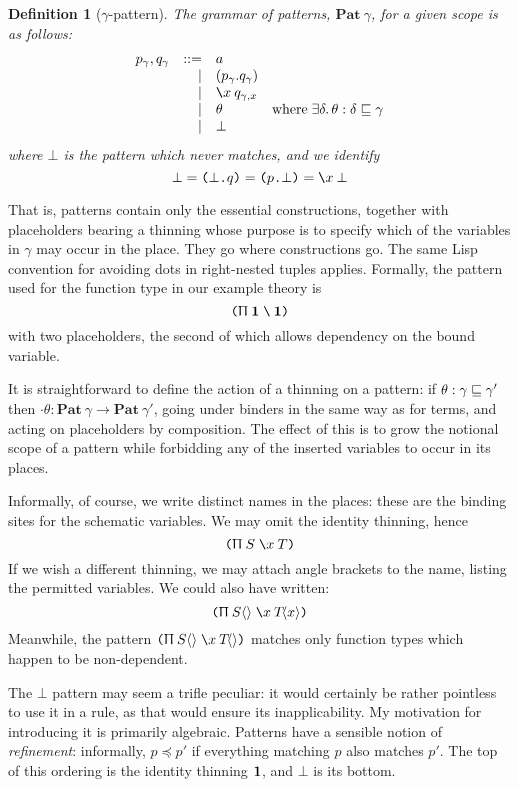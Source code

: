 \documentclass{jfp1}
\newtheorem{definition}[theorem]{Definition}
\newcommand{\Pa}[1]{\texttt{(}#1\texttt{)}}
\newcommand{\dt}{\texttt{.}}
\newcommand{\cn}[2]{\Pa{#1 \dt #2}}
\begin{document}
\newcommand{\Pat}[1]{\textbf{Pat}\:#1}
\begin{definition}[$\gamma$-pattern]
The grammar of patterns, $\Pat\gamma$, for a given scope is as follows:
\[\begin{array}{rrl@{\quad}l}
    p_\gamma, q_\gamma & ::= & a \\
         &   | & (p_\gamma.q_\gamma) \\
         &   | & \la x q_{\gamma,x} \\
         &   | & \theta & \mbox{where}\;\exists\delta.\,\theta :
                          \delta\thin\gamma \\
         &   | & \bot
  \end{array}\]
where $\bot$ is the pattern which \emph{never} matches, and we identify
\[\bot = \cn\bot q = \cn p\bot = \la x\bot
  \]
\end{definition}

\newcommand{\huth}[1]{\langle #1 \rangle}
That is, patterns contain only the essential constructions, together with
placeholders bearing a thinning whose purpose is to specify which of
the variables in $\gamma$ may occur in the place. They go where constructions
go. The same Lisp convention for avoiding dots in right-nested tuples applies.
Formally, the pattern used for the function type in our example theory is
\[
  \PI \ith {}\ith
\]
with two placeholders, the second of which allows dependency on the
bound variable.

It is straightforward to define the action of a thinning on a pattern: if
$\theta : \gamma\sqsubseteq\gamma'$ then $\cdot\theta :
\Pat\gamma\to\Pat{\gamma'}$, going under binders in the same way as
for terms, and acting on placeholders by composition.
The effect of this is to grow the notional scope of a pattern while
forbidding any of the inserted variables to occur in its places.

Informally, of course, we write distinct names in the places: these are the
binding sites for the schematic variables. We may omit the identity thinning,
hence
\[
  \PI SxT
\]
If we wish a different thinning, we may attach angle brackets to the name,
listing the permitted variables. We could also have written:
\[
  \PI{S\huth{}}x{T\!\huth{x}}
\]
Meanwhile, the pattern $\PI{S\huth{}}x{T\!\huth{}}$ matches only function types which
happen to be non-dependent.

\newcommand{\pr}{\preceq}
The $\bot$ pattern may seem a trifle peculiar: it would certainly be
rather pointless to use it in a rule, as that would ensure its
inapplicability. My motivation for introducing it is primarily
algebraic. Patterns have a sensible notion of \emph{refinement}:
informally, $p\pr p'$ if everything matching $p$ also matches $p'$. The top of this
ordering is the identity thinning $\mathbf{1}$, and $\bot$ is its bottom.
\end{document}
